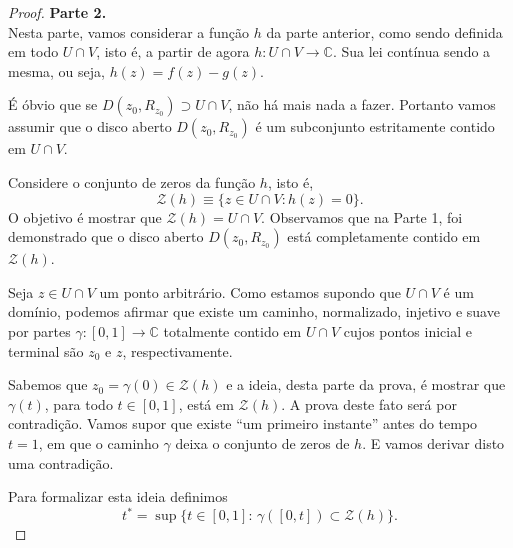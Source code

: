 \begin{proof}
\medskip
\noindent\textbf{Parte 2.}
\\
Nesta parte, vamos considerar a função $h$ da parte anterior, 
como sendo definida em todo $U\cap V$, isto é, a partir de agora 
$h:U\cap V\to\mathbb{C}$. Sua lei contínua sendo a mesma, ou seja, 
$h(z)=f(z)-g(z)$.

É óbvio que se $D(z_0,R_{z_0})\supset U\cap V$, não há mais nada a fazer. Portanto
vamos assumir que o disco aberto $D(z_0,R_{z_0})$ é um subconjunto estritamente contido
em $U\cap V$. 



\medskip 

Considere o conjunto de zeros da função $h$, isto é,
\[
\mathcal{Z}(h)
\equiv 
\{ z\in U\cap V : h(z)=0 \}.
\]
O objetivo é mostrar que $\mathcal{Z}(h)=U\cap V$. 
Observamos que na Parte 1, foi demonstrado que 
o disco aberto $D(z_0,R_{z_0})$ está completamente contido em $\mathcal{Z}(h)$. 

Seja $z\in U\cap V$ um ponto arbitrário. 
Como estamos supondo que $U\cap V$ é um domínio, podemos
afirmar que existe um caminho, normalizado, injetivo e suave por partes
$\gamma:[0,1]\to\mathbb{C}$ totalmente contido em $U\cap V$
cujos pontos inicial e terminal são $z_0$ e $z$, 
respectivamente. 



Sabemos que $z_0=\gamma(0)\in \mathcal{Z}(h)$ e a ideia, 
desta parte da prova, é mostrar
que $\gamma(t)$, para todo $t\in[0,1]$, está em $\mathcal{Z}(h)$.
A prova deste fato será por contradição. Vamos supor que existe ``um primeiro instante''
antes do tempo $t=1$, em que o caminho $\gamma$ deixa o conjunto de zeros de $h$. E
vamos derivar disto uma contradição.

Para formalizar esta ideia definimos
\[
t^{*} = \sup\big\{ t\in [0,1]:\, \gamma([0,t])\subset \mathcal{Z}(h) \big\}.
\]


\end{proof}

